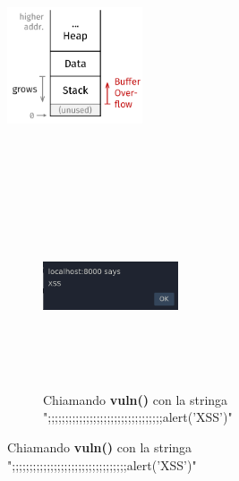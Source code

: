 \documentclass{beamer}
\begin{document}
\begin{frame}
\begin{columns}
\begin{column}{0.55\textwidth}
\begin{itemize}
            \end{itemize}
    \end{column}
    \begin{column}{0.45\textwidth}
      \begin{figure}[htbp]
        \includegraphics[width=4cm,height=6cm,keepaspectratio]{images/memory_layout.png}
        \newline\newline\newline
        \begin{figure}
          \includegraphics[width=4cm,height=6cm,keepaspectratio]{images/xss.png}
          \caption{Chiamando \textbf{vuln()} con la stringa
          ";;;;;;;;;;;;;;;;;;;;;;;;;;;;;;;;;alert('XSS')"}
        \end{figure}
        \end{figure}
    \end{column}
  \end{columns}
\end{frame}
\end{document}
